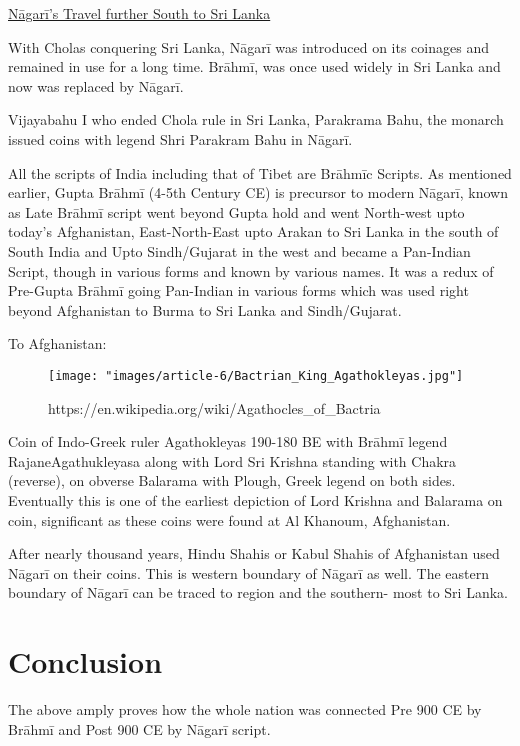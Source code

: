 \underline{Nāgarī’s Travel further South to Sri Lanka}

With Cholas conquering Sri Lanka, Nāgarī was introduced on its coinages and remained in use for a long time. Brāhmī, was once used widely in Sri Lanka and now was replaced by Nāgarī.

Vijayabahu I who ended Chola rule in Sri Lanka, Parakrama Bahu, the monarch issued coins with legend Shri Parakram Bahu in Nāgarī.

All the scripts of India including that of Tibet are Brāhmīc Scripts. As mentioned earlier, Gupta Brāhmī (4-5th Century CE) is precursor to modern Nāgarī, known as Late Brāhmī script went beyond Gupta hold and went North-west upto today’s Afghanistan, East-North-East upto Arakan to Sri Lanka in the south of South India and Upto Sindh/Gujarat in the west and became a Pan-Indian Script, though in various forms and known by various names. It was a redux of Pre-Gupta Brāhmī going Pan-Indian in various forms which was used right beyond Afghanistan to Burma to Sri Lanka and Sindh/Gujarat.

To Afghanistan:

\begin{figure}
\texttt{[image: "images/article-6/Bactrian\_King\_Agathokleyas.jpg"]}
\caption{https://en.wikipedia.org/wiki/Agathocles_of_Bactria}
\end{figure}

Coin of Indo-Greek ruler Agathokleyas 190-180 BE with Brāhmī legend RajaneAgathukleyasa along with Lord Sri Krishna standing with Chakra (reverse), on obverse Balarama with Plough, Greek legend on both sides. Eventually this is one of the earliest depiction of Lord Krishna and Balarama on coin, significant as these coins were found at Al Khanoum, Afghanistan.

After nearly thousand years, Hindu Shahis or Kabul Shahis of Afghanistan used Nāgarī on their coins. This is western boundary of Nāgarī as well. The eastern boundary of Nāgarī can be traced to  region and the southern- most to Sri Lanka.


\section*{Conclusion}

The above amply proves how the whole nation was connected Pre 900 CE by Brāhmī and Post 900 CE by Nāgarī script.


